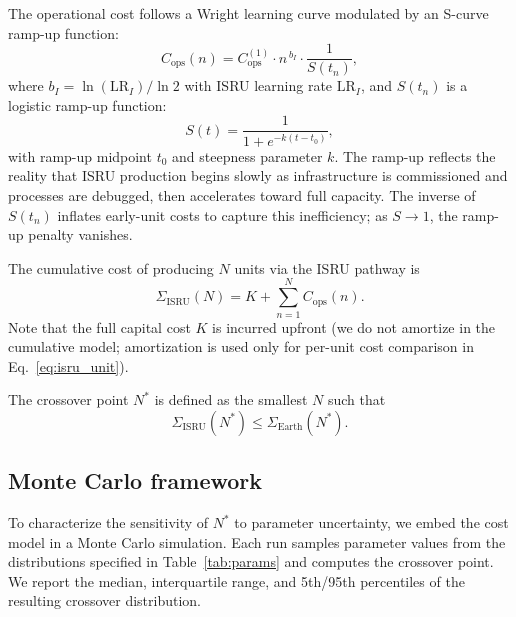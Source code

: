 \documentclass[preprint,12pt]{elsarticle}
\begin{document}
The operational cost follows a Wright learning curve modulated by an S-curve ramp-up function:
\begin{equation}
  C_{\mathrm{ops}}(n) = C_{\mathrm{ops}}^{(1)} \cdot n^{\,b_I} \cdot \frac{1}{S(t_n)},
  \label{eq:isru_ops}
\end{equation}
where $b_I = \ln(\mathrm{LR}_I)/\ln 2$ with ISRU learning rate $\mathrm{LR}_I$, and $S(t_n)$ is a logistic ramp-up function:
\begin{equation}
  S(t) = \frac{1}{1 + e^{-k(t - t_0)}},
  \label{eq:scurve}
\end{equation}
with ramp-up midpoint $t_0$ and steepness parameter $k$. The ramp-up reflects the reality that ISRU production begins slowly as infrastructure is commissioned and processes are debugged, then accelerates toward full capacity. The inverse of $S(t_n)$ inflates early-unit costs to capture this inefficiency; as $S \to 1$, the ramp-up penalty vanishes.

The cumulative cost of producing $N$ units via the ISRU pathway is
\begin{equation}
  \Sigma_{\mathrm{ISRU}}(N) = K + \sum_{n=1}^{N} C_{\mathrm{ops}}(n).
  \label{eq:isru_cum}
\end{equation}
Note that the full capital cost $K$ is incurred upfront (we do not amortize in the cumulative model; amortization is used only for per-unit cost comparison in Eq.~\ref{eq:isru_unit}).

The crossover point $N^*$ is defined as the smallest $N$ such that
\begin{equation}
  \Sigma_{\mathrm{ISRU}}(N^*) \leq \Sigma_{\mathrm{Earth}}(N^*).
  \label{eq:crossover}
\end{equation}

\subsection{Monte Carlo framework}

To characterize the sensitivity of $N^*$ to parameter uncertainty, we embed the cost model in a Monte Carlo simulation. Each run samples parameter values from the distributions specified in Table~\ref{tab:params} and computes the crossover point. We report the median, interquartile range, and 5th/95th percentiles of the resulting crossover distribution.
\end{document}
